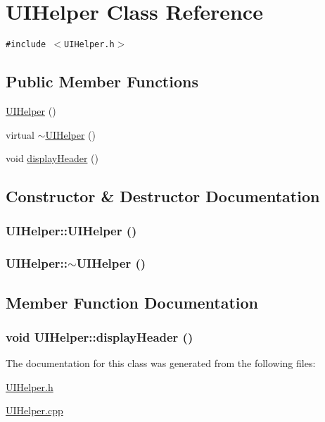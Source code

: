 \hypertarget{class_u_i_helper}{
\section{UIHelper Class Reference}
\label{class_u_i_helper}
}
{\tt \#include $<$UIHelper.h$>$}

\subsection*{Public Member Functions}
\begin{CompactItemize}
\item 
\hyperlink{class_u_i_helper_064f3bdbb8bc6545e365a04e701b2cb3}{UIHelper} ()
\item 
virtual \hyperlink{class_u_i_helper_7fbc25fb59eaf085735bc303632fc576}{$\sim$UIHelper} ()
\item 
void \hyperlink{class_u_i_helper_626a53a3308909e66c67873826055ff9}{display\-Header} ()
\end{CompactItemize}


\subsection{Constructor \& Destructor Documentation}
\hypertarget{class_u_i_helper_064f3bdbb8bc6545e365a04e701b2cb3}{
\subsubsection[UIHelper]{\setlength{\rightskip}{0pt plus 5cm}UIHelper::UIHelper ()}}
\label{class_u_i_helper_064f3bdbb8bc6545e365a04e701b2cb3}


\hypertarget{class_u_i_helper_7fbc25fb59eaf085735bc303632fc576}{
\subsubsection[$\sim$UIHelper]{\setlength{\rightskip}{0pt plus 5cm}UIHelper::$\sim$UIHelper ()}}
\label{class_u_i_helper_7fbc25fb59eaf085735bc303632fc576}




\subsection{Member Function Documentation}
\hypertarget{class_u_i_helper_626a53a3308909e66c67873826055ff9}{
\subsubsection[displayHeader]{\setlength{\rightskip}{0pt plus 5cm}void UIHelper::display\-Header ()}}
\label{class_u_i_helper_626a53a3308909e66c67873826055ff9}




The documentation for this class was generated from the following files:\begin{CompactItemize}
\item 
\hyperlink{_u_i_helper_8h}{UIHelper.h}\item 
\hyperlink{_u_i_helper_8cpp}{UIHelper.cpp}\end{CompactItemize}
